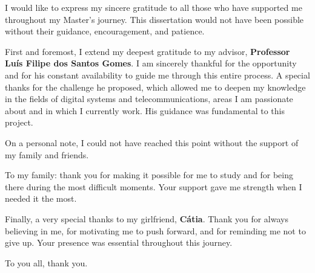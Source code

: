
%

\begin{ntacknowledgements}

I would like to express my sincere gratitude to all those who have supported me throughout my Master's journey. This dissertation would not have been possible without their guidance, encouragement, and patience.


First and foremost, I extend my deepest gratitude to my advisor, \textbf{Professor Luís Filipe dos Santos Gomes}. I am sincerely thankful for the opportunity and for his constant availability to guide me through this entire process. A special thanks for the challenge he proposed, which allowed me to deepen my knowledge in the fields of digital systems and telecommunications, areas I am passionate about and in which I currently work. His guidance was fundamental to this project.


On a personal note, I could not have reached this point without the support of my family and friends.

To my family: thank you for making it possible for me to study and for being there during the most difficult moments. Your support gave me strength when I needed it the most.

Finally, a very special thanks to my girlfriend, \textbf{Cátia}. Thank you for always believing in me, for motivating me to push forward, and for reminding me not to give up. Your presence was essential throughout this journey.

To you all, thank you.

\end{ntacknowledgements}